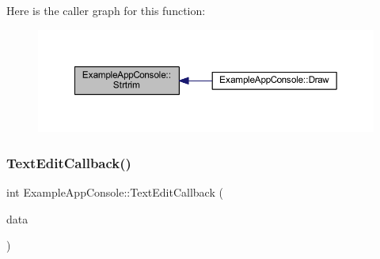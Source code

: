 Here is the caller graph for this function\+:
\nopagebreak
\begin{figure}[H]
\begin{center}
\leavevmode
\includegraphics[width=350pt]{struct_example_app_console_af9a1afa791f9bd14701bed396b09de1c_icgraph}
\end{center}
\end{figure}
\mbox{\label{struct_example_app_console_a0bc85c5dd2bef56ae1a64697be00ec87}} 
\subsubsection{\texorpdfstring{Text\+Edit\+Callback()}{TextEditCallback()}}
{\footnotesize\ttfamily int Example\+App\+Console\+::\+Text\+Edit\+Callback (\begin{DoxyParamCaption}\item[{\mbox{\hyperlink{struct_im_gui_input_text_callback_data}{Im\+Gui\+Input\+Text\+Callback\+Data}} $\ast$}]{data }\end{DoxyParamCaption})\hspace{0.3cm}{\ttfamily [inline]}}

